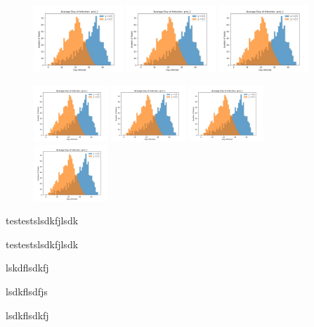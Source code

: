 \documentclass[letterpaper,11pt]{article}
\begin{document}
    \begin{figure}[htp]
        \centering
        \includegraphics[width=0.3\textwidth]{histogram_grid_1_0_7.jpg}
        \includegraphics[width=0.3\textwidth]{histogram_grid_1_0_7.jpg}
        \includegraphics[width=0.3\textwidth]{histogram_grid_1_0_7.jpg}
    \end{figure}

    \begin{figure}[htp]
        \centering
        \includegraphics[width=0.25\textwidth]{histogram_grid_1_0_7.jpg}\hfill
        \includegraphics[width=0.25\textwidth]{histogram_grid_1_0_7.jpg}\hfill
        \includegraphics[width=0.25\textwidth]{histogram_grid_1_0_7.jpg}\hfill
        \includegraphics[width=0.25\textwidth]{histogram_grid_1_0_7.jpg}
    \end{figure}
testestslsdkfjlsdk

testestslsdkfjlsdk

lskdflsdkfj


lsdkflsdfjs

lsdkflsdkfj
\end{document}
